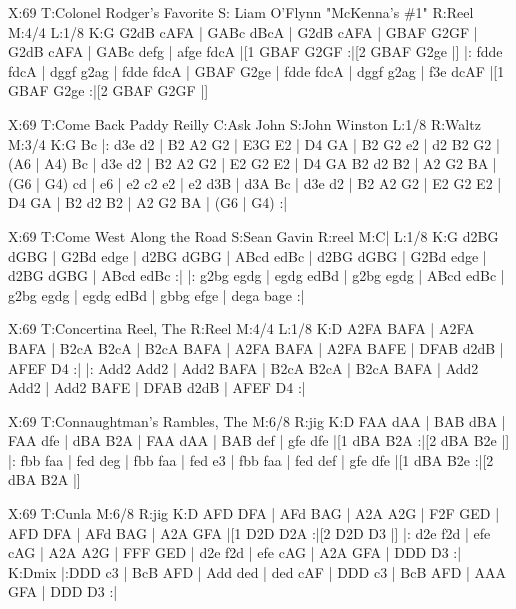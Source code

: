 \documentclass[letterpaper]{article}
\begin{document}
\begin{abc}[name]
X:69
T:Colonel Rodger's Favorite
S: Liam O'Flynn "McKenna's \#1"
R:Reel
M:4/4
L:1/8
K:G
G2dB cAFA | GABc dBcA | G2dB cAFA | GBAF G2GF |
G2dB cAFA | GABc defg | afge fdcA |[1 GBAF G2GF :|[2 GBAF G2ge |]
|: fdde fdcA | dggf g2ag | fdde fdcA | GBAF G2ge |
fdde fdcA | dggf g2ag | f3e dcAF |[1 GBAF G2ge :|[2 GBAF G2GF |]
\end{abc}

\begin{abc}[name]
X:69
T:Come Back Paddy Reilly
C:Ask John
S:John Winston
L:1/8
R:Waltz
M:3/4
K:G
Bc |: d3e d2 | B2 A2 G2 | E3G E2 | D4 GA |
B2 G2 e2 | d2 B2 G2 | (A6 | A4) Bc |
d3e d2 | B2 A2 G2 | E2 G2 E2 | D4 GA
B2 d2 B2 | A2 G2 BA | (G6 | G4) cd |
e6 | e2 c2 e2 | e2 d3B | d3A Bc |
d3e d2 | B2 A2 G2 | E2 G2 E2 | D4 GA |
B2 d2 B2 | A2 G2 BA | (G6 | G4) :|
\end{abc}

\begin{abc}[name]
X:69
T:Come West Along the Road
S:Sean Gavin
R:reel
M:C|
L:1/8
K:G
d2BG dGBG | G2Bd edge | d2BG dGBG | ABcd edBc |
d2BG dGBG | G2Bd edge | d2BG dGBG | ABcd edBc :| 
|: g2bg egdg | egdg edBd | g2bg egdg | ABcd edBc | 
g2bg egdg | egdg edBd | gbbg efge | dega bage :|
\end{abc}

\begin{abc}[name]
X:69
T:Concertina Reel, The
R:Reel
M:4/4
L:1/8
K:D
A2FA BAFA | A2FA BAFA | B2cA B2cA | B2cA BAFA |
A2FA BAFA | A2FA BAFE | DFAB d2dB | AFEF D4 :|
|: Add2 Add2 | Add2 BAFA | B2cA B2cA | B2cA BAFA |
Add2 Add2 | Add2 BAFE | DFAB d2dB | AFEF D4 :|
\end{abc}

\begin{abc}[name]
X:69
T:Connaughtman's Rambles, The
M:6/8
R:jig
K:D
FAA dAA | BAB dBA | FAA dfe | dBA B2A |
FAA dAA | BAB def | gfe dfe |[1 dBA B2A :|[2 dBA B2e |]
|: fbb faa | fed deg | fbb faa | fed e3 |
fbb faa | fed def | gfe dfe |[1 dBA B2e :|[2 dBA B2A |]
\end{abc}

\begin{abc}[name]
X:69
T:Cunla
M:6/8
R:jig
K:D
AFD DFA | AFd BAG | A2A A2G | F2F GED |
AFD DFA | AFd BAG | A2A GFA |[1 D2D D2A :|[2 D2D D3 |]
|: d2e f2d | efe cAG | A2A A2G | FFF GED |
d2e f2d | efe cAG | A2A GFA | DDD D3 :|
K:Dmix
|:DDD c3 | BcB AFD | Add ded | ded cAF |
DDD c3 | BcB AFD | AAA GFA | DDD D3 :|
\end{abc}
\end{document}
